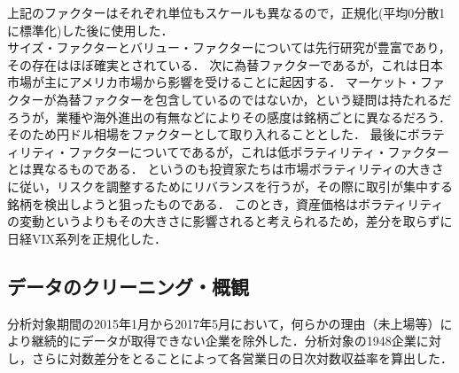 ﻿\documentclass[a4paper]{jarticle}
\begin{document}
\begin{itemize}
\begin{itemize}
\end{itemize}
上記のファクターはそれぞれ単位もスケールも異なるので，正規化(平均0分散1に標準化)した後に使用した．\\
\quad 
サイズ・ファクターとバリュー・ファクターについては先行研究が豊富であり，その存在はほぼ確実とされている．
次に為替ファクターであるが，これは日本市場が主にアメリカ市場から影響を受けることに起因する．
マーケット・ファクターが為替ファクターを包含しているのではないか，という疑問は持たれるだろうが，業種や海外進出の有無などによりその感度は銘柄ごとに異なるだろう．
そのため円ドル相場をファクターとして取り入れることとした．
最後にボラティリティ・ファクターについてであるが，これは低ボラティリティ・ファクターとは異なるものである．
というのも投資家たちは市場ボラティリティの大きさに従い，リスクを調整するためにリバランスを行うが，その際に取引が集中する銘柄を検出しようと狙ったものである．
このとき，資産価格はボラティリティの変動というよりもその大きさに影響されると考えられるため，差分を取らずに日経VIX系列を正規化した．\\

\end{itemize}



\subsection{データのクリーニング・概観}
分析対象期間の2015年1月から2017年5月において，何らかの理由（未上場等）により継続的にデータが取得できない企業を除外した．分析対象の1948企業に対し，さらに対数差分をとることによって各営業日の日次対数収益率を算出した．
\end{document}
